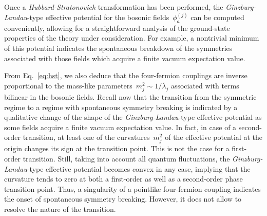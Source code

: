 \documentclass[prd,english,preprintnumbers,amsmath,amssymb,nofootinbib,twocolumn,superscriptaddress]{revtex4-1}
\begin{document}
{Once a {\it Hubbard-Stratonovich} transformation has been performed, the {\it Ginzburg-Landau}-type effective potential for the bosonic fields~$\phi^{(j)}_a$ 
can be computed conveniently, allowing for a straightforward analysis of the ground-state properties of the 
theory under consideration. For example, a nontrivial minimum 
of this potential indicates the spontaneous breakdown of the symmetries associated with those fields which acquire
a finite vacuum expectation value. 

From Eq.~\eqref{eq:hst}, we also deduce that the four-fermion couplings are 
inverse proportional to the mass-like parameters~$m^2_j\sim 1/\bar{\lambda}_j$ 
associated with terms bilinear in the bosonic fields. Recall now that the transition from the symmetric regime
to a regime with spontaneous symmetry breaking is indicated by a qualitative change of the shape 
of the {\it Ginzburg-Landau}-type effective potential as some fields acquire a finite vacuum expectation value. 
In fact, in case of a second-order transition, at least one of the curvatures~$m^2_j$ of the effective potential 
at the origin changes its sign
at the transition point. This is not the case for a first-order transition.
Still, {taking into account all quantum fluctuations, the} {\it Ginzburg-Landau}-type effective potential becomes
convex in any case, implying that the curvature tends to zero at both a first-order {as well as a second-order}
phase transition point.
Thus, a singularity of a pointlike four-fermion
coupling indicates the onset of spontaneous symmetry breaking.
However, it does not allow to resolve the nature of the transition. 

}
\end{document}
